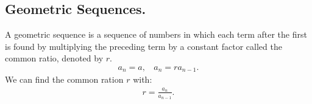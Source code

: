 \documentclass{report}
\begin{document}
   \bigbreak \noindent 

   \pagebreak \bigbreak \noindent
   \subsection{Geometric Sequences.}
   \bigbreak \noindent 
   \smallbreak \noindent
   \begin{definition}
         A geometric sequence is a sequence of numbers in which each term after the first is found by multiplying the preceding term by a constant factor called the common ratio, denoted by $r$.
    \begin{align*}
      a_{n} = a, \ \ \ \ a_{n} = ra_{n-1}
    .\end{align*}
    \bigbreak \noindent 
    We can find the common ration $r$ with:
    \begin{align*}
      r = \frac{a_{n}}{a_{n-1}}
    .\end{align*}

   \end{definition}
\end{document}
